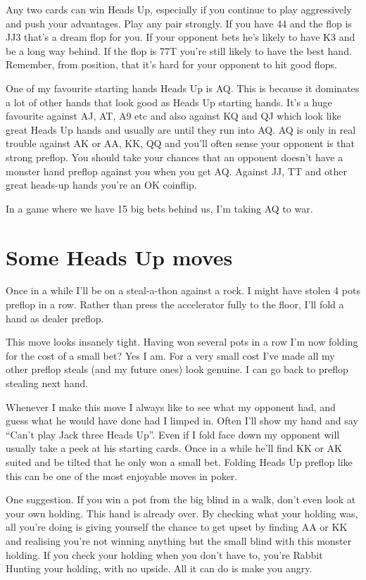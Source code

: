Any two cards can win Heads Up, especially if you continue
to play aggressively and push your advantages. Play any
pair strongly. If you have 44 and the flop is JJ3 that's
a dream flop for you. If your opponent bets he's likely
to have K3 and be a long way behind. If the flop is 77T
you're still likely to have the best hand. Remember,
from position, that it's hard for your opponent to
hit good flops.

One of my favourite starting hands Heads Up is AQ.
This is because it dominates a lot of other hands
that look good as Heads Up starting hands.
It's a huge favourite against AJ, AT, A9 etc and also
against KQ and QJ which look like great Heads Up hands
and usually are until they run into AQ. AQ is only in
real trouble against AK or AA, KK, QQ and you'll often
sense your opponent is that strong preflop. You should
take your chances that an opponent doesn't have a monster
hand preflop against you when you get AQ. Against JJ, TT
and other great heads-up hands you're an OK coinflip.

In a game where we have 15 big bets behind us, I'm
taking AQ to war.

\section{Some Heads Up moves}

Once in a while I'll be on a steal-a-thon against
a rock. I might have stolen 4 pots preflop in a row.
Rather than press the accelerator fully to the floor,
I'll fold a hand as dealer preflop.

This move looks insanely tight. Having won several
pots in a row I'm now folding for the cost of a small bet?
Yes I am. For a very small cost I've made all my other
preflop steals (and my future ones) look genuine. I can go
back to preflop stealing next hand.

Whenever I make this move I always like to see what
my opponent had, and guess what he would have done had
I limped in. Often I'll show my hand and say ``Can't play
Jack three Heads Up''. Even if I fold face down my opponent
will usually take a peek at his starting cards. Once
in a while he'll find KK or AK suited and be tilted
that he only won a small bet. Folding Heads Up preflop
like this can be one of the most enjoyable moves in poker.

One suggestion. If you win a pot from the big blind in a walk,
don't even look at your own holding. This hand is already over. By
checking what your holding was, all you're doing is giving yourself
the chance to get upset by finding AA or KK and realising you're not
winning anything but the small blind with this monster holding. If you
check your holding when you don't have to, you're Rabbit Hunting your
holding, with no upside. All it can do is make you angry.

